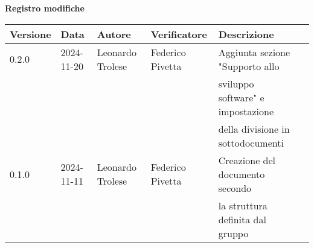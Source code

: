 \begin{center}
    \textbf{Registro modifiche}\\
    \vspace{2mm}

    \begin{tabular}{|l|l|l|l|l|l|}
    \hline
    \textbf{Versione} & \textbf{Data} & \textbf{Autore} & \textbf{Verificatore} & \textbf{Descrizione}\\
    \hline
    0.2.0 & 2024-11-20  & Leonardo Trolese & Federico Pivetta  & Aggiunta sezione "Supporto allo \\ & & & & sviluppo software" e impostazione \\ & & & & della divisione in sottodocumenti\\
    \hline
    0.1.0 & 2024-11-11  & Leonardo Trolese & Federico Pivetta  & Creazione del documento secondo \\ & & & & la struttura definita dal gruppo\\
    \hline
    \end{tabular}
\end{center}